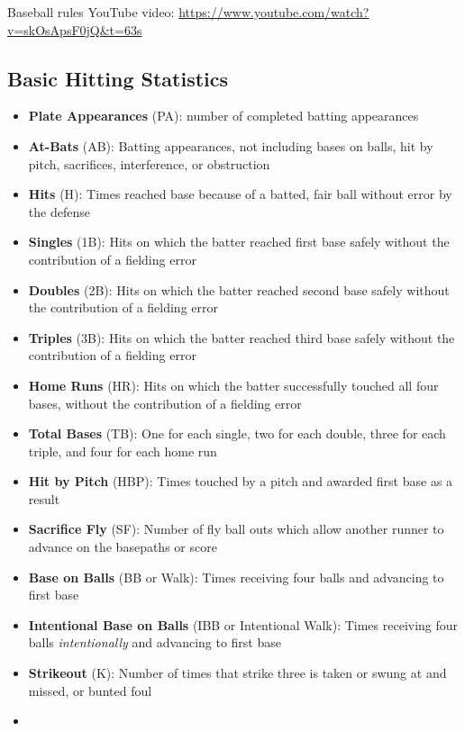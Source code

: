 \documentclass[
  11pt,
]{book}
\theoremstyle{definition}
\theoremstyle{definition}
\theoremstyle{definition}
\theoremstyle{definition}
\theoremstyle{remark}
\begin{document}
Baseball rules YouTube video: \url{https://www.youtube.com/watch?v=skOsApsF0jQ\&t=63s}

\hypertarget{basic-hitting-statistics}{%
\subsection{Basic Hitting Statistics}\label{basic-hitting-statistics}}

\begin{itemize}
\item
  \textbf{Plate Appearances} (PA): number of completed batting appearances
\item
  \textbf{At-Bats} (AB): Batting appearances, not including bases on balls, hit by pitch, sacrifices, interference, or obstruction
\item
  \textbf{Hits} (H): Times reached base because of a batted, fair ball without error by the defense
\item
  \textbf{Singles} (1B): Hits on which the batter reached first base safely without the contribution of a fielding error
\item
  \textbf{Doubles} (2B): Hits on which the batter reached second base safely without the contribution of a fielding error
\item
  \textbf{Triples} (3B): Hits on which the batter reached third base safely without the contribution of a fielding error
\item
  \textbf{Home Runs} (HR): Hits on which the batter successfully touched all four bases, without the contribution of a fielding error
\item
  \textbf{Total Bases} (TB): One for each single, two for each double, three for each triple, and four for each home run
\item
  \textbf{Hit by Pitch} (HBP): Times touched by a pitch and awarded first base as a result
\item
  \textbf{Sacrifice Fly} (SF): Number of fly ball outs which allow another runner to advance on the basepaths or score
\item
  \textbf{Base on Balls} (BB or Walk): Times receiving four balls and advancing to first base
\item
  \textbf{Intentional Base on Balls} (IBB or Intentional Walk): Times receiving four balls \emph{intentionally} and advancing to first base
\item
  \textbf{Strikeout} (K): Number of times that strike three is taken or swung at and missed, or bunted foul
\item

\end{itemize}
\end{document}
